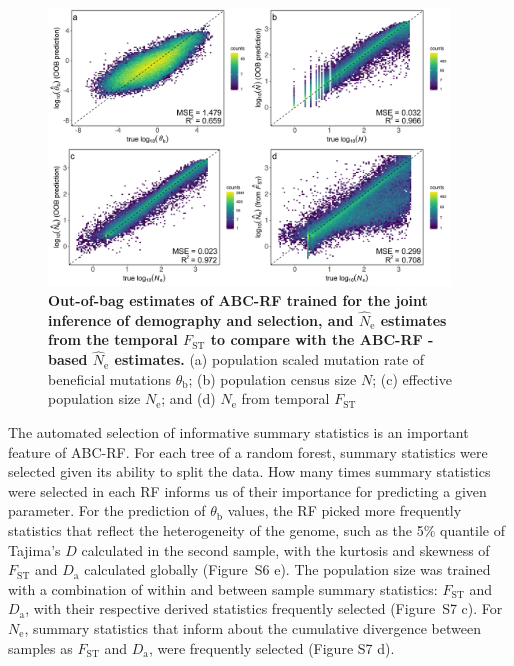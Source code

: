 \documentclass[a4paper, 12pt]{article}
\begin{document}
\begin{figure}[ht]
  \centering
  \includegraphics[width=0.95\textwidth]{Figures/Figure2_join_demo_sel.pdf}
  \small\caption{\textbf{Out-of-bag estimates of ABC-RF trained for the joint inference of demography and selection, and $\hat N_{\mathrm{e}}$ estimates from the temporal $F_{\mathrm{ST}}$ to compare with the ABC-RF -based $\hat N_{\mathrm{e}}$ estimates.}
  (a) population scaled mutation rate of beneficial mutations $\theta_\mathrm{b}$; (b) population census size $N$; (c) effective population size $N_{\mathrm{e}}$;  and (d) $N_{\mathrm{e}}$ from temporal $F_{\mathrm{ST}}$}
  \label{fig:oob_jointDemoSel}
\end{figure}

The automated selection of informative summary statistics is an important feature of ABC-RF. For each tree of a random forest, summary statistics were selected given its ability to split the data. How many times summary statistics were selected in each RF informs us of their importance for predicting a given parameter. For the prediction of $\theta_{\mathrm{b}}$ values, the RF picked more frequently statistics that reflect the heterogeneity of the genome, such as the 5\% quantile of Tajima's $D$ calculated in the second sample, with the kurtosis and skewness of $F_{\mathrm{ST}}$ and $D_{\mathrm{a}}$ calculated globally (Figure~S6 e). The population size was trained with a combination of within and between sample summary statistics: $F_{\mathrm{ST}}$ and $D_{\mathrm{a}}$, with their respective derived statistics frequently selected (Figure~S7 c). For $N_{\mathrm{e}}$, summary statistics that inform about the cumulative divergence between samples as $F_{\mathrm{ST}}$ and $D_{\mathrm{a}}$, were frequently selected (Figure S7 d).
\end{document}
